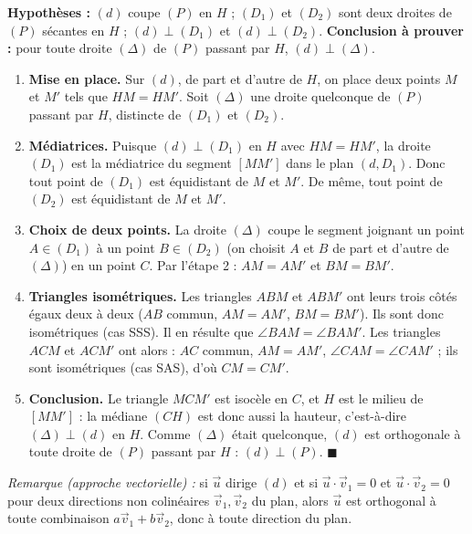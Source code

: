 \documentclass[11pt]{article}
\newcommand{\cle}[1]{{\popxbold\color{popdark}#1}}
\begin{document}
\begin{experience}
\textbf{Hypothèses :} $(d)$ coupe $(P)$ en $H$ ; $(D_1)$ et $(D_2)$ sont deux droites de $(P)$ sécantes en $H$ ; $(d) \perp (D_1)$ et $(d) \perp (D_2)$.
\textbf{Conclusion à prouver :} pour toute droite $(\Delta)$ de $(P)$ passant par $H$, $(d) \perp (\Delta)$.

\begin{enumerate}
\item \textbf{Mise en place.} Sur $(d)$, de part et d'autre de $H$, on place deux points $M$ et $M'$ tels que $HM = HM'$. Soit $(\Delta)$ une droite quelconque de $(P)$ passant par $H$, distincte de $(D_1)$ et $(D_2)$.
\item \textbf{Médiatrices.} Puisque $(d) \perp (D_1)$ en $H$ avec $HM = HM'$, la droite $(D_1)$ est la \cle{médiatrice} du segment $[MM']$ dans le plan $(d, D_1)$. Donc tout point de $(D_1)$ est équidistant de $M$ et $M'$. De même, tout point de $(D_2)$ est équidistant de $M$ et $M'$.
\item \textbf{Choix de deux points.} La droite $(\Delta)$ coupe le segment joignant un point $A \in (D_1)$ à un point $B \in (D_2)$ (on choisit $A$ et $B$ de part et d'autre de $(\Delta)$) en un point $C$. Par l'étape 2 : $AM = AM'$ et $BM = BM'$.
\item \textbf{Triangles isométriques.} Les triangles $ABM$ et $ABM'$ ont leurs trois côtés égaux deux à deux ($AB$ commun, $AM = AM'$, $BM = BM'$). Ils sont donc isométriques (cas SSS). Il en résulte que $\angle BAM = \angle BAM'$. Les triangles $ACM$ et $ACM'$ ont alors : $AC$ commun, $AM = AM'$, $\angle CAM = \angle CAM'$ ; ils sont isométriques (cas SAS), d'où $CM = CM'$.
\item \textbf{Conclusion.} Le triangle $MCM'$ est isocèle en $C$, et $H$ est le milieu de $[MM']$ : la médiane $(CH)$ est donc aussi la hauteur, c'est-à-dire $(\Delta) \perp (d)$ en $H$. Comme $(\Delta)$ était quelconque, $(d)$ est orthogonale à toute droite de $(P)$ passant par $H$ : $(d) \perp (P)$. $\blacksquare$
\end{enumerate}
\emph{Remarque (approche vectorielle) :} si $\vec{u}$ dirige $(d)$ et si $\vec{u} \cdot \vec{v}_1 = 0$ et $\vec{u} \cdot \vec{v}_2 = 0$ pour deux directions non colinéaires $\vec{v}_1, \vec{v}_2$ du plan, alors $\vec{u}$ est orthogonal à toute combinaison $a\vec{v}_1 + b\vec{v}_2$, donc à toute direction du plan.
\end{experience}
\end{document}
